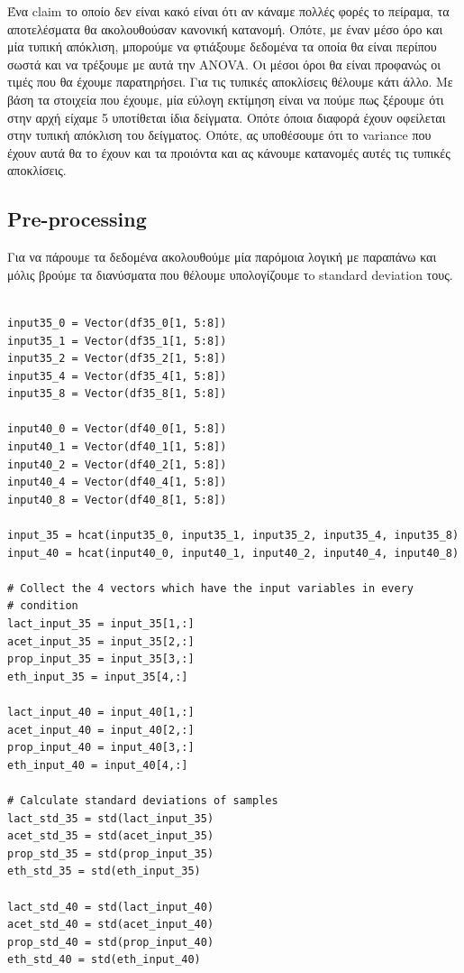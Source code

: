 \documentclass[11pt]{article}
\begin{document}
Ένα claim το οποίο δεν είναι κακό είναι ότι αν κάναμε πολλές φορές το πείραμα, τα αποτελέσματα θα ακολουθούσαν κανονική κατανομή. Οπότε, με έναν μέσο όρο και μία τυπική απόκλιση, μπορούμε να φτιάξουμε δεδομένα τα οποία θα είναι περίπου σωστά και να τρέξουμε με αυτά την ANOVA. Οι μέσοι όροι θα είναι προφανώς οι τιμές που θα έχουμε παρατηρήσει. Για τις τυπικές αποκλίσεις θέλουμε κάτι άλλο. Με βάση τα στοιχεία που έχουμε, μία εύλογη εκτίμηση είναι να πούμε πως ξέρουμε ότι στην αρχή είχαμε 5 υποτίθεται ίδια δείγματα. Οπότε όποια διαφορά έχουν οφείλεται στην τυπική απόκλιση του δείγματος. Οπότε, ας υποθέσουμε ότι το variance που έχουν αυτά θα το έχουν και τα προιόντα και ας κάνουμε κατανομές αυτές τις τυπικές αποκλίσεις.

\subsection{Pre-processing}
\label{sec:org126e3ca}
Για να πάρουμε τα δεδομένα ακολουθούμε μία παρόμοια λογική με παραπάνω και μόλις βρούμε τα διανύσματα που θέλουμε υπολογίζουμε τo standard deviation τους.

\begin{verbatim}

input35_0 = Vector(df35_0[1, 5:8])
input35_1 = Vector(df35_1[1, 5:8])
input35_2 = Vector(df35_2[1, 5:8])
input35_4 = Vector(df35_4[1, 5:8])
input35_8 = Vector(df35_8[1, 5:8])

input40_0 = Vector(df40_0[1, 5:8])
input40_1 = Vector(df40_1[1, 5:8])
input40_2 = Vector(df40_2[1, 5:8])
input40_4 = Vector(df40_4[1, 5:8])
input40_8 = Vector(df40_8[1, 5:8])

input_35 = hcat(input35_0, input35_1, input35_2, input35_4, input35_8)
input_40 = hcat(input40_0, input40_1, input40_2, input40_4, input40_8)

# Collect the 4 vectors which have the input variables in every
# condition
lact_input_35 = input_35[1,:]
acet_input_35 = input_35[2,:]
prop_input_35 = input_35[3,:]
eth_input_35 = input_35[4,:]

lact_input_40 = input_40[1,:]
acet_input_40 = input_40[2,:]
prop_input_40 = input_40[3,:]
eth_input_40 = input_40[4,:]

# Calculate standard deviations of samples
lact_std_35 = std(lact_input_35)
acet_std_35 = std(acet_input_35)
prop_std_35 = std(prop_input_35)
eth_std_35 = std(eth_input_35)

lact_std_40 = std(lact_input_40)
acet_std_40 = std(acet_input_40)
prop_std_40 = std(prop_input_40)
eth_std_40 = std(eth_input_40)
\end{verbatim}
\end{document}
